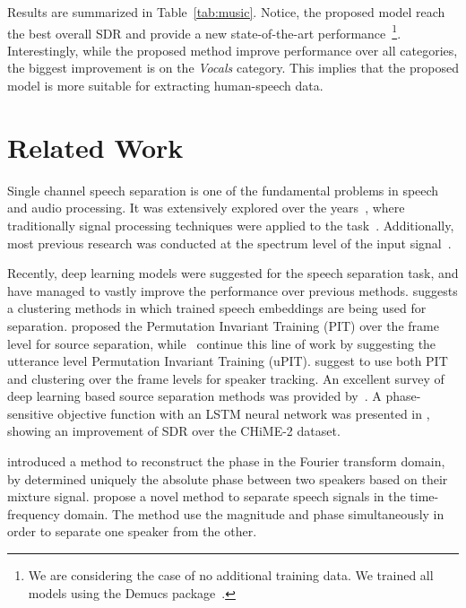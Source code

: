 \documentclass{article}
\begin{document}
 Results are summarized in Table~\ref{tab:music}. Notice, the proposed model reach the best overall SDR and provide a new state-of-the-art performance~\footnote{We are considering the case of no additional training data. We trained all models using the Demucs package~\citep{defossez2019music}.}. Interestingly, while the proposed method improve performance over all categories, the biggest improvement is on the \textit{Vocals} category. This implies that the proposed model is more suitable for extracting human-speech data.







 \section{Related Work}

Single channel speech separation is one of the fundamental problems in speech and audio processing. It was extensively explored over the years~\cite{logeshwari2012survey,martin2018single,ernst2018speech}, where traditionally signal processing techniques were applied to the task~\cite{choi2005blind}. Additionally, most previous research was conducted at the spectrum level of the input signal~\cite{wang2018supervised,ernst2018speech}. 

Recently, deep learning models were suggested for the speech separation task, and have managed to vastly improve the performance over previous methods. \citet{hershey2016deep} suggests a clustering methods in which trained speech embeddings are being used for separation. \citet{yu2017permutation} proposed the Permutation Invariant Training (PIT) over the frame level for source separation, while~\citet{kolbaek2017multitalker} continue this line of work by suggesting the utterance level Permutation Invariant Training (uPIT). \citet{liu2019divide} suggest to use both PIT and clustering over the frame levels for speaker tracking. An excellent survey of deep learning based source separation methods was provided by~\citet{wang2018supervised}. A phase-sensitive objective function with an LSTM neural network was presented in \citet{erdogan2015phase}, showing an improvement of SDR over the CHiME-2 \cite{vincent2013second} dataset.


\citet{wang2019deep} introduced a method to reconstruct the phase in the Fourier transform domain, by determined uniquely the absolute phase between two speakers based on their mixture signal. \citet{wang2018end} propose a novel method to separate speech signals in the time-frequency domain. The method use the magnitude and phase simultaneously in order to separate one speaker from the other. 
\end{document}
